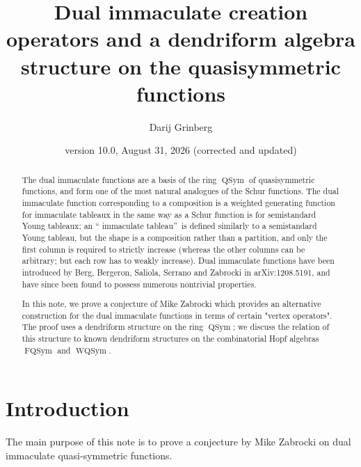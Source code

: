 \documentclass[numbers=enddot,12pt,final,onecolumn,notitlepage,abstracton]{scrartcl}%
\theoremstyle{definition}
\newenvironment{noncompile}{}{}
\begin{document}
\title{Dual immaculate creation operators and a dendriform algebra structure on the
quasisymmetric functions}
\author{Darij Grinberg}
\date{version 10.0, August 31, 2026 (corrected and updated)}
\maketitle

\begin{abstract}
The dual immaculate functions are a basis of the ring $\operatorname*{QSym}$
of quasisymmetric functions, and form one of the most natural analogues of the
Schur functions. The dual immaculate function corresponding to a composition
is a weighted generating function for immaculate tableaux in the same way as a
Schur function is for semistandard Young tableaux; an \textquotedblleft
immaculate tableau\textquotedblright\ is defined similarly to a semistandard
Young tableau, but the shape is a composition rather than a partition, and
only the first column is required to strictly increase (whereas the other
columns can be arbitrary; but each row has to weakly increase). Dual
immaculate functions have been introduced by Berg, Bergeron, Saliola, Serrano
and Zabrocki in arXiv:1208.5191, and have since been found to possess numerous
nontrivial properties.

In this note, we prove a conjecture of Mike Zabrocki which provides an
alternative construction for the dual immaculate functions in terms of certain
"vertex operators". The proof uses a dendriform structure on the ring
$\operatorname*{QSym}$; we discuss the relation of this structure to known
dendriform structures on the combinatorial Hopf algebras
$\operatorname*{FQSym}$ and $\operatorname*{WQSym}$.

\end{abstract}

\section{Introduction}

\begin{noncompile}
The main purpose of this note is to prove a conjecture by Mike Zabrocki on
dual immaculate quasi-symmetric functions.
\end{noncompile}
\end{document}
